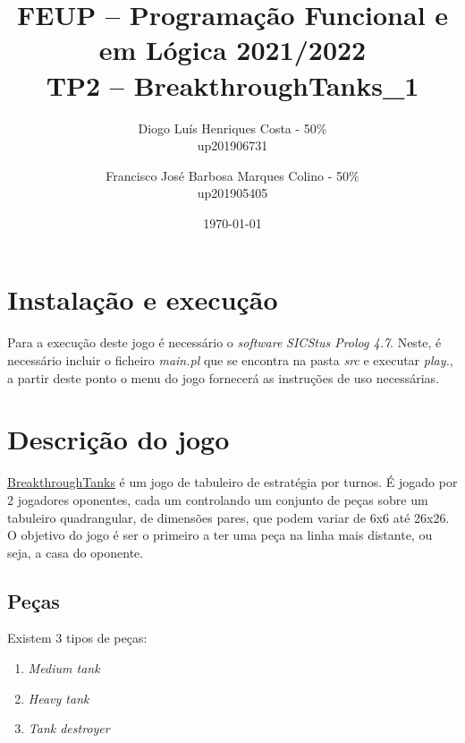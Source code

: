 \documentclass[a4paper,11pt,portuguese]{article}
\begin{document}

\author{
    Diogo Luís Henriques Costa - 50\% \\
    up201906731
    \and
    Francisco José Barbosa Marques Colino - 50\% \\
    up201905405
}
\title{FEUP -- Programação Funcional e em Lógica \large 2021/2022 \\ \large TP2 -- BreakthroughTanks\_1}
\date{\today}
\maketitle


\section{Instalação e execução}

Para a execução deste jogo é necessário o \textit{software} \textit{SICStus Prolog 4.7}. Neste, é necessário incluir o ficheiro
\textit{main.pl} que se encontra na pasta \textit{src} e executar \textit{play.}, a partir  deste ponto o menu 
do jogo fornecerá as instruções de uso necessárias.


\section{Descrição do jogo}

\href{https://boardgamegeek.com/boardgame/321224/breakthrough-tanks}{BreakthroughTanks}
é um jogo de tabuleiro de estratégia por turnos. É jogado por 2 jogadores oponentes, cada 
um controlando um conjunto de peças sobre um tabuleiro quadrangular, de dimensões pares, que podem variar
de 6x6 até 26x26. O objetivo do jogo é ser o primeiro a ter uma peça na linha mais distante, ou seja, a casa do oponente. 

\subsection{Peças}

\noindent Existem 3 tipos de peças:

\begin{enumerate}[topsep=4pt,itemsep=2pt]
    \item \textit{Medium tank}
    \item \textit{Heavy tank}
    \item \textit{Tank destroyer}
\end{enumerate}
\end{document}
